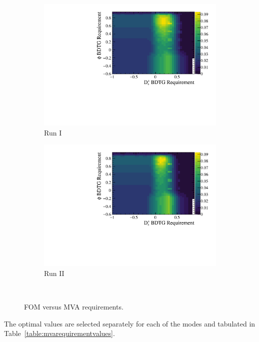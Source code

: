 \begin{figure}[!h]
\begin{subfigure}[t]{0.4\textwidth}
      \centering
      \includegraphics[width=1.0\textwidth]{figs/Selection/Ds2KPiPi_BDTG_punzi_Run1_cont.pdf}
      \caption{Run I \decay{\Dsp}{\Kp\pim\pip}}
   \end{subfigure}
   \begin{subfigure}[t]{0.4\textwidth}
      \centering
      \includegraphics[width=1.0\textwidth]{figs/Selection/Ds2KPiPi_BDTG_punzi_Run2_cont.pdf}
      \caption{Run II \decay{\Dsp}{\Kp\pim\pip}}
   \end{subfigure}\\
   \caption{FOM versus MVA requirements.}
   \label{fig:mvaoptmisation}   
\end{figure}

The optimal values are selected separately for each of the modes and tabulated in Table~\ref{table:mvarequirementvalues}.

